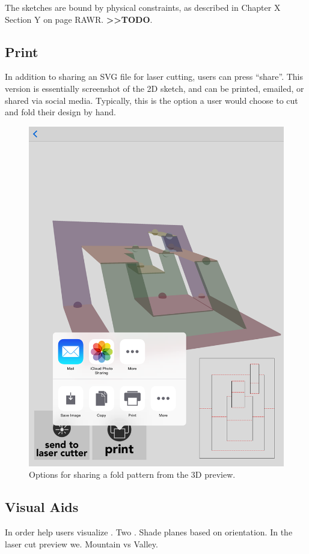 The sketches are bound by physical constraints, as described in Chapter
X Section Y on page RAWR. \textbf{\textgreater{}\textgreater{}TODO}.

\subsection{Print}\label{print}

In addition to sharing an SVG file for laser cutting, users can press
``share''. This version is essentially screenshot of the 2D sketch, and
can be printed, emailed, or shared via social media. Typically, this is
the option a user would choose to cut and fold their design by hand.

\begin{figure}[htbp]
\centering
\includegraphics{figures/32_UI_Tool_Interactions/3d-share.png}
\caption{Options for sharing a fold pattern from the 3D preview.}
\end{figure}

\subsection{Visual Aids}\label{visual-aids}

In order help users visualize . Two . Shade planes based on orientation.
In the laser cut preview we. Mountain vs Valley.
